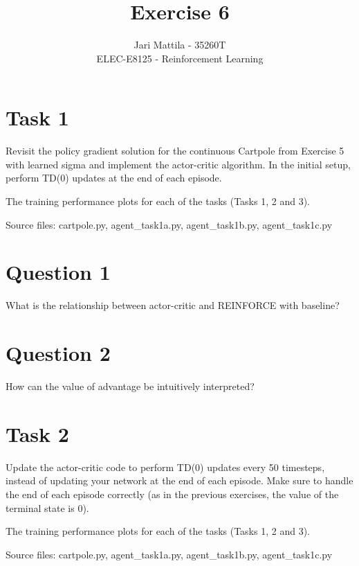 \documentclass[12pt]{article}
\begin{document}
 
\title{Exercise 6}
\author{Jari Mattila - 35260T\\
ELEC-E8125 - Reinforcement Learning}

\maketitle

\section*{Task 1}

Revisit the policy gradient solution for the continuous Cartpole from
Exercise 5 with learned sigma and implement the actor-critic algorithm. 
In the initial setup, perform TD(0) updates at the end of each episode.
\newline

The training performance plots for each of the tasks (Tasks 1, 2 and 3).
\newline

\noindent
Source files: cartpole.py, agent\_task1a.py, agent\_task1b.py, agent\_task1c.py 

\section*{Question 1}

What is the relationship between actor-critic and REINFORCE with
baseline?

\section*{Question 2}

How can the value of advantage be intuitively interpreted?

\section*{Task 2}

Update the actor-critic code to perform TD(0) updates every 50 timesteps,
instead of updating your network at the end of each episode. Make sure to handle the end of
each episode correctly (as in the previous exercises, the value of the terminal state is 0).
\newline

The training performance plots for each of the tasks (Tasks 1, 2 and 3).
\newline

\noindent
Source files: cartpole.py, agent\_task1a.py, agent\_task1b.py, agent\_task1c.py 
\end{document}

